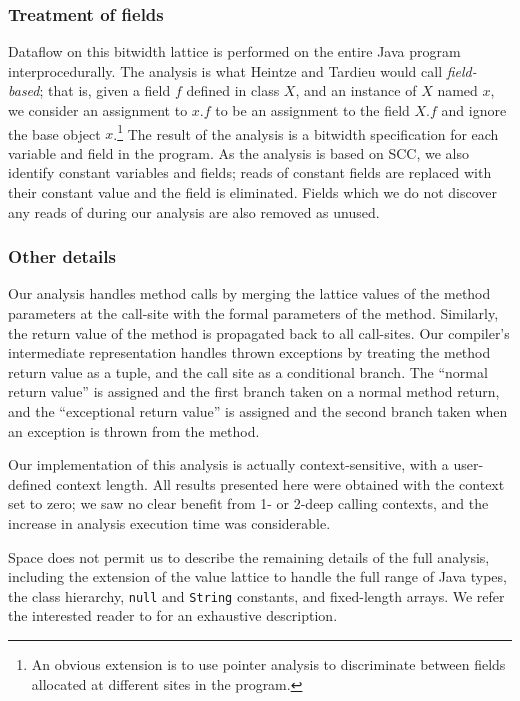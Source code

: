 \documentclass{acmconf}
\begin{document}
\subsubsection{Treatment of fields}
Dataflow on this bitwidth lattice is performed on the entire Java
program interprocedurally.  The analysis is what Heintze and Tardieu
\cite{heintze01}
would call {\it field-based}; that is, given a field $f$ defined in
class $X$, and an instance of $X$ named $x$, we consider an assignment
to $x.f$ to be an assignment to the field $X.f$ and ignore the base
object $x$.\footnote{An obvious extension is to use pointer
analysis to discriminate between fields allocated at different sites
in the program.}  The result of the analysis is a bitwidth
specification for each variable and field in the program.  As the
analysis is based on SCC, we also identify constant variables and
fields; reads of constant fields are replaced with their constant
value and the field is eliminated.  Fields which we do not discover
any reads of during our analysis are also removed as unused.

\subsubsection{Other details}
Our analysis handles method calls by merging the lattice values of the
method parameters at the call-site with the formal parameters of the
method.  Similarly, the return value of the method is propagated back
to all call-sites.  Our compiler's intermediate representation handles
thrown exceptions by treating the method return value as a tuple, and
the call site as a conditional branch.  The ``normal return value'' is
assigned and the first branch taken on a normal method return, and the
``exceptional return value'' is assigned and the second branch taken when an
exception is thrown from the method.

Our implementation of this analysis is actually context-sensitive,
with a user-defined context length.  All results presented here were
obtained with the context set to zero; we saw no clear benefit from 1-
or 2-deep calling contexts, and the increase in analysis execution
time was considerable.

Space does not permit us to describe the remaining details of the full
analysis, including the extension of the value
lattice to handle the full range of Java types, the class hierarchy,
{\tt null} and {\tt String} constants, and fixed-length arrays.
We refer the interested reader to \cite{ananian99:tech} for an
exhaustive description.
\end{document}
